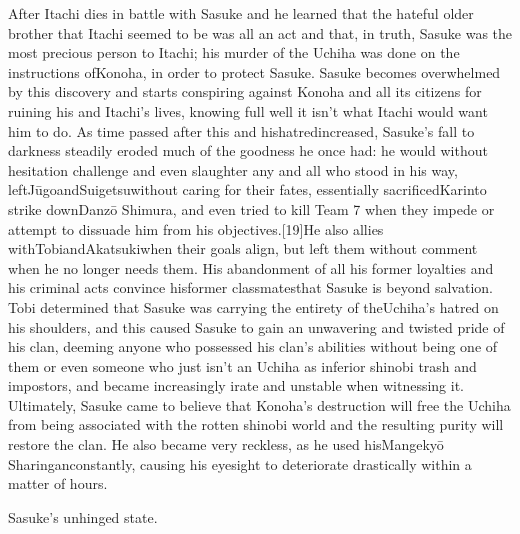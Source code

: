 \documentclass[a4paper,12pt]{article}
\begin{document}
After Itachi dies in battle with Sasuke and he learned that the hateful older brother that Itachi seemed to be was all an act and that, in truth, Sasuke was the most precious person to Itachi; his murder of the Uchiha was done on the instructions ofKonoha, in order to protect Sasuke. Sasuke becomes overwhelmed by this discovery and starts conspiring against Konoha and all its citizens for ruining his and Itachi's lives, knowing full well it isn't what Itachi would want him to do. As time passed after this and hishatredincreased, Sasuke's fall to darkness steadily eroded much of the goodness he once had: he would without hesitation challenge and even slaughter any and all who stood in his way, leftJūgoandSuigetsuwithout caring for their fates, essentially sacrificedKarinto strike downDanzō Shimura, and even tried to kill Team 7 when they impede or attempt to dissuade him from his objectives.[19]He also allies withTobiandAkatsukiwhen their goals align, but left them without comment when he no longer needs them. His abandonment of all his former loyalties and his criminal acts convince hisformer classmatesthat Sasuke is beyond salvation. Tobi determined that Sasuke was carrying the entirety of theUchiha's hatred on his shoulders, and this caused Sasuke to gain an unwavering and twisted pride of his clan, deeming anyone who possessed his clan's abilities without being one of them or even someone who just isn't an Uchiha as inferior shinobi trash and impostors, and became increasingly irate and unstable when witnessing it. Ultimately, Sasuke came to believe that Konoha's destruction will free the Uchiha from being associated with the rotten shinobi world and the resulting purity will restore the clan. He also became very reckless, as he used hisMangekyō Sharinganconstantly, causing his eyesight to deteriorate drastically within a matter of hours.\\ \par \vspace{0.5cm}

Sasuke's unhinged state.\\ \par \vspace{0.5cm}
\end{document}
